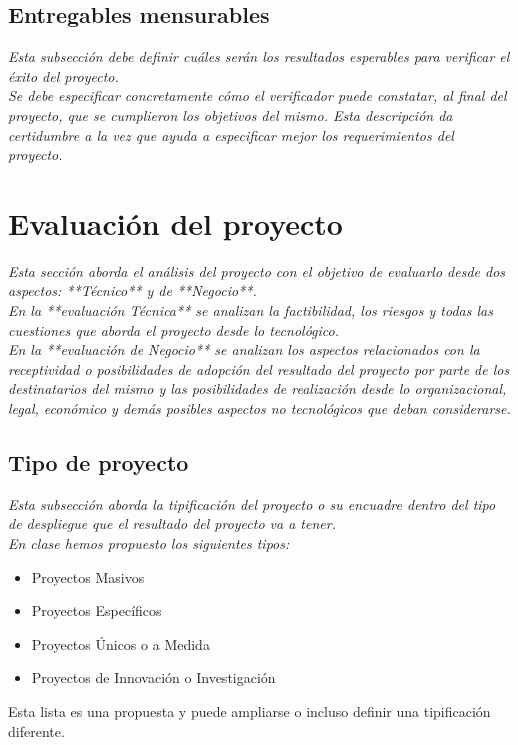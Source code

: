 \documentclass[12pt]{article}
\begin{document}
\subsection{Entregables mensurables}
{\it
Esta subsección debe definir cuáles serán los resultados esperables para verificar el éxito del proyecto.\\
Se debe especificar concretamente cómo el verificador puede constatar, al final del proyecto, que se cumplieron los objetivos del mismo. Esta descripción da certidumbre a la vez que ayuda a especificar mejor los requerimientos del proyecto.
}


\section{Evaluación del proyecto}
{\it
Esta sección aborda el análisis del proyecto con el objetivo de evaluarlo desde dos aspectos: **Técnico** y de **Negocio**.\\
En la **evaluación Técnica** se analizan la factibilidad, los riesgos y todas las cuestiones que aborda el proyecto desde lo tecnológico.\\
En la **evaluación de Negocio** se analizan los aspectos relacionados con la receptividad o posibilidades de adopción del resultado del proyecto por parte de los destinatarios del mismo y las posibilidades de realización desde lo organizacional, legal, económico y demás posibles aspectos no tecnológicos que deban considerarse.
}


\subsection{Tipo de proyecto}
{\it
Esta subsección aborda la tipificación del proyecto o su encuadre dentro del tipo de despliegue que el resultado del proyecto va a tener.\\
En clase hemos propuesto los siguientes tipos:
\begin{itemize}
\setlength{\itemsep}{0pt}
  \item Proyectos Masivos
  \item Proyectos Específicos
  \item Proyectos Únicos o a Medida
  \item Proyectos de Innovación o Investigación
\end{itemize}
Esta lista es una propuesta y puede ampliarse o incluso definir una tipificación diferente.
}
\end{document}
